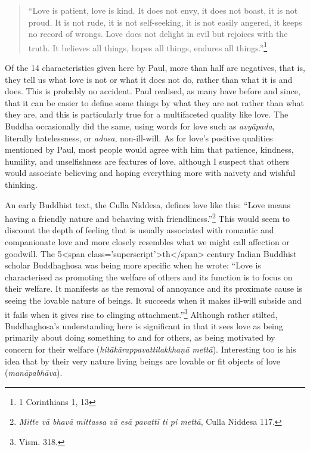 \documentclass[10pt, openright]{book}
\begin{document}
\begin{quote}


“Love is patient, love is kind. It does not envy, it does not boast, it is not proud. It is not rude, it is not self-seeking, it is not easily angered, it keeps no record of wrongs. Love does not delight in evil but rejoices with the truth. It believes all things, hopes all things, endures all things.”\footnote {1 Corinthians 1, 13}




\end{quote}
Of the 14 characteristics given here by Paul, more than half are negatives, that is, they tell us what love is not or what it does not do, rather than what it is and does. This is probably no accident. Paul realised, as many have before and since, that it can be easier to define some things by what they are not rather than what they are, and this is particularly true for a multifaceted quality like love. The Buddha occasionally did the same, using words for love such as \textit{avyāpada}, literally hatelessness, or \textit{adosa}, non-ill-will. As for love’s positive qualities mentioned by Paul, most people would agree with him that patience, kindness, humility, and unselfishness are features of love, although I suspect that others would associate believing and hoping everything more with naivety and wishful thinking.


An early Buddhist text, the Culla Niddesa, defines love like this: “Love means having a friendly nature and behaving with friendliness.”\footnote {\textit{Mitte vā bhavā mittassa vā esā pavattī ti pi mettā}, Culla Niddesa 117.} This would seem to discount the depth of feeling that is usually associated with romantic and companionate love and more closely resembles what we might call affection or goodwill. The 5<span class='superscript'>th</span> century Indian Buddhist scholar Buddhaghosa was being more specific when he wrote: “Love is characterised as promoting the welfare of others and its function is to focus on their welfare. It manifests as the removal of annoyance and its proximate cause is seeing the lovable nature of beings. It succeeds when it makes ill-will subside and it fails when it gives rise to clinging attachment.”\footnote {Vism. 318.} Although rather stilted, Buddhaghosa’s understanding here is significant in that it sees love as being primarily about doing something to and for others, as being motivated by concern for their welfare (\textit{hitākārappavattilakkhaṇā mettā}). Interesting too is his idea that by their very nature living beings are lovable or fit objects of love (\textit{manāpabhāva}).
\end{document}
